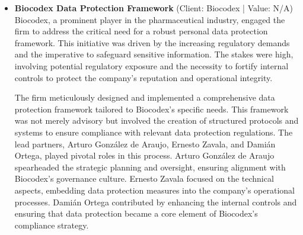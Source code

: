 \documentclass[11pt]{article}
\begin{document}
\begin{itemize}
Lead partners Arturo González de Araujo, Ernesto Zavala, and Damián Ortega played pivotal roles in this advisory capacity. They led a team that meticulously examined the legal frameworks governing data protection, ensuring that MEGA DIRECT's practices aligned with legal requirements. Their efforts were instrumental in safeguarding the client's business continuity amidst regulatory scrutiny. 

This matter underscores the firm's capability to deliver strategic legal solutions in complex regulatory landscapes, reinforcing its position as a trusted advisor in data protection matters.
\item \textbf{Biocodex Data Protection Framework} (Client: Biocodex | Value: N/A)\\ Biocodex, a prominent player in the pharmaceutical industry, engaged the firm to address the critical need for a robust personal data protection framework. This initiative was driven by the increasing regulatory demands and the imperative to safeguard sensitive information. The stakes were high, involving potential regulatory exposure and the necessity to fortify internal controls to protect the company's reputation and operational integrity. 

The firm meticulously designed and implemented a comprehensive data protection framework tailored to Biocodex's specific needs. This framework was not merely advisory but involved the creation of structured protocols and systems to ensure compliance with relevant data protection regulations. The lead partners, Arturo González de Araujo, Ernesto Zavala, and Damián Ortega, played pivotal roles in this process. Arturo González de Araujo spearheaded the strategic planning and oversight, ensuring alignment with Biocodex's governance culture. Ernesto Zavala focused on the technical aspects, embedding data protection measures into the company's operational processes. Damián Ortega contributed by enhancing the internal controls and ensuring that data protection became a core element of Biocodex's compliance strategy.


\end{itemize}
\end{document}
